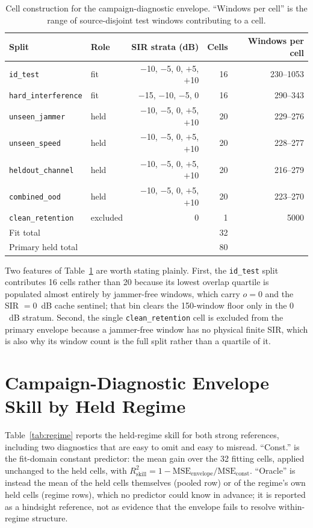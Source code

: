 \documentclass[letterpaper,onecolumn,11pt,journal]{IEEEtran}
\begin{document}
\begin{table}[t]
\centering
\caption{Cell construction for the campaign-diagnostic envelope. ``Windows per cell'' is
the range of source-disjoint test windows contributing to a cell.}
\label{tab:cells}
\footnotesize
\setlength{\tabcolsep}{3pt}
\begin{tabular}{llrrr}
\toprule
Split & Role & SIR strata (dB) & Cells & Windows per cell\\
\midrule
\texttt{id\_test} & fit & $-$10, $-$5, 0, $+$5, $+$10 & 16 & 230--1053\\
\texttt{hard\_interference} & fit & $-$15, $-$10, $-$5, 0 & 16 & 290--343\\
\texttt{unseen\_jammer} & held & $-$10, $-$5, 0, $+$5, $+$10 & 20 & 229--276\\
\texttt{unseen\_speed} & held & $-$10, $-$5, 0, $+$5, $+$10 & 20 & 228--277\\
\texttt{heldout\_channel} & held & $-$10, $-$5, 0, $+$5, $+$10 & 20 & 216--279\\
\texttt{combined\_ood} & held & $-$10, $-$5, 0, $+$5, $+$10 & 20 & 223--270\\
\texttt{clean\_retention} & excluded & $0$ & 1 & 5000\\
\midrule
\multicolumn{3}{l}{Fit total} & 32 & \\
\multicolumn{3}{l}{Primary held total} & 80 & \\
\bottomrule
\end{tabular}
\end{table}

Two features of Table~\ref{tab:cells} are worth stating plainly. First, the
\texttt{id\_test} split contributes 16 cells rather than 20 because its lowest
overlap quartile is populated almost entirely by jammer-free windows, which
carry $o=0$ and the SIR $=0$~dB cache sentinel; that bin clears the 150-window
floor only in the $0$~dB stratum. Second, the single
\texttt{clean\_retention} cell is excluded from the primary envelope because a
jammer-free window has no physical finite SIR, which is also why its window
count is the full split rather than a quartile of it.

\section{Campaign-Diagnostic Envelope Skill by Held Regime}
Table~\ref{tab:regime} reports the held-regime skill for both strong
references, including two diagnostics that are easy to omit and easy to
misread. ``Const.'' is the fit-domain constant predictor: the mean gain over
the 32 fitting cells, applied unchanged to the held cells, with
$R^2_{\mathrm{skill}}=1-\mathrm{MSE}_{\mathrm{envelope}}/\mathrm{MSE}_{\mathrm{const}}$.
``Oracle'' is instead the mean of the held cells themselves (pooled row) or of
the regime's own held cells (regime rows), which no predictor could know in
advance; it is reported as a hindsight reference, not as evidence that the
envelope fails to resolve within-regime structure.
\end{document}
